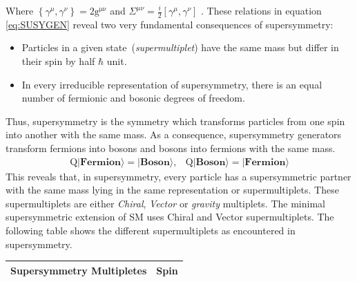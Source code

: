 Where $\left\lbrace \gamma^{\mu}, \gamma^{\nu}\right\rbrace = 2\mathrm{g^{\mu\nu}}$ and  $\Sigma^{\mu\nu} = \frac{i}{2}\left[\gamma^{\mu},\gamma^{\nu}\right]$ 
. %
These relations in equation \ref{eq:SUSYGEN} reveal two very fundamental consequences of supersymmetry:
\begin{itemize}
\item  Particles in a given state~(\textit{supermultiplet}) have the same mass but differ in their spin by half $\hbar$ unit.
\item In every irreducible representation of supersymmetry, there is an equal number of fermionic and bosonic degrees of freedom. 
\end{itemize}
Thus, supersymmetry is the symmetry which transforms particles from one spin into another with the same mass. As a consequence, supersymmetry generators transform fermions into bosons and bosons into fermions with the same mass.
\begin{eqnarray}
\mathrm{Q}|\textbf{Fermion}\rangle =|\textbf{Boson}\rangle,    &
\mathrm{Q}|\textbf{Boson}\rangle  =|\textbf{Fermion} \rangle 
\end{eqnarray}
This reveals that, in supersymmetry, every particle has a supersymmetric partner with the same mass lying in the same representation or supermultiplets.
These supermultiplets are either \textit{Chiral}, \textit{Vector} or \textit{gravity} multiplets. The minimal supersymmetric extension of SM uses Chiral and Vector supermultiplets. 
The following table shows the different supermultiplets as encountered in supersymmetry.
\begin{center}
\centering
\begin{tabular}{c c}
\hline
\bfseries{Supersymmetry Multipletes} & \bfseries {Spin}\\
\hline

\hline \hline
\end{tabular}
\label{tab:SUSYM} 
\end{center}



